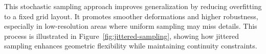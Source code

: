 This stochastic sampling approach improves generalization by reducing overfitting to a fixed grid layout.  
It promotes smoother deformations and higher robustness, especially in low-resolution areas where uniform sampling may miss details.  
This process is illustrated in Figure~\ref{fig:jittered-sampling}, showing how jittered sampling enhances geometric flexibility while maintaining continuity constraints.

\usetikzlibrary{arrows.meta, shapes.geometric}
\begin{figure}[h!]
  \centering
  \begin{adjustbox}{center}
\end{adjustbox}
\end{figure}

